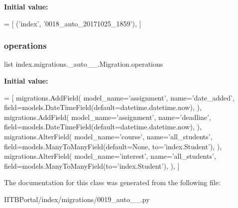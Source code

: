 {\bfseries Initial value\+:}
\begin{DoxyCode}
=  [
        (\textcolor{stringliteral}{'index'}, \textcolor{stringliteral}{'0018\_auto\_20171025\_1859'}),
    ]
\end{DoxyCode}
\mbox{\label{classindex_1_1migrations_1_10019__auto__20171025__1939_1_1Migration_a115c1ae6004a56ce24f9ae3d6a89cf06}} 
\subsubsection{\texorpdfstring{operations}{operations}}
{\footnotesize\ttfamily list index.\+migrations.\+\_\+auto\+\_\+\_.\+Migration.\+operations\hspace{0.3cm}{\ttfamily [static]}}

{\bfseries Initial value\+:}
\begin{DoxyCode}
=  [
        migrations.AddField(
            model\_name=\textcolor{stringliteral}{'assignment'},
            name=\textcolor{stringliteral}{'date\_added'},
            field=models.DateTimeField(default=datetime.datetime.now),
        ),
        migrations.AddField(
            model\_name=\textcolor{stringliteral}{'assignment'},
            name=\textcolor{stringliteral}{'deadline'},
            field=models.DateTimeField(default=datetime.datetime.now),
        ),
        migrations.AlterField(
            model\_name=\textcolor{stringliteral}{'course'},
            name=\textcolor{stringliteral}{'all\_students'},
            field=models.ManyToManyField(default=\textcolor{keywordtype}{None}, to=\textcolor{stringliteral}{'index.Student'}),
        ),
        migrations.AlterField(
            model\_name=\textcolor{stringliteral}{'interest'},
            name=\textcolor{stringliteral}{'all\_students'},
            field=models.ManyToManyField(to=\textcolor{stringliteral}{'index.Student'}),
        ),
    ]
\end{DoxyCode}


The documentation for this class was generated from the following file\+:\begin{DoxyCompactItemize}
\item 
I\+I\+T\+B\+Portal/index/migrations/0019\+\_\+auto\+\_\+\_.\+py\end{DoxyCompactItemize}
